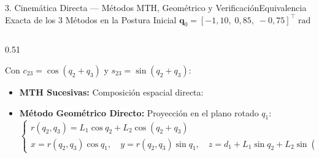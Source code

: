 \documentclass[aspectratio=169,10pt,xcolor=table]{beamer}
\newcommand{\T}{^{\!\top}}
\begin{document}
\begin{frame}{3. Cinemática Directa --- Métodos MTH, Geométrico y Verificación}{Equivalencia Exacta de los 3 Métodos en la Postura Inicial $\bm{q}_0=[-1{,}10,\;0{,}85,\;-0{,}75]\T\;\text{rad}$}
\begin{columns}[T,totalwidth=\textwidth]
  \begin{column}{0.51\textwidth}
    \begin{cajadef}[Matriz de Transformación Total $T_0^3(\bm{q}) = A_1 A_2 A_3$]
      \fontsize{6.5}{7.9}\selectfont
      Con $c_{23}=\cos(q_2+q_3)$ y $s_{23}=\sin(q_2+q_3)$:\\[1mm]
    \end{cajadef}

    \vspace{0.7mm}
    \begin{cajaidea}
      \fontsize{6.5}{7.9}\selectfont
      \begin{itemize}\setlength{\itemsep}{1pt}
        \item \textbf{MTH Sucesivas:} Composición espacial directa:\\[0.8mm]
        \item \textbf{Método Geométrico Directo:} Proyección en el plano rotado $q_1$:
        \[
        \begin{cases}
        r(q_2,q_3) = L_1\cos q_2 + L_2\cos(q_2+q_3)\\
        x = r(q_2,q_3)\cos q_1,\quad y = r(q_2,q_3)\sin q_1,\quad z = d_1 + L_1\sin q_2 + L_2\sin(q_2+q_3)
        \end{cases}
        \]
      \end{itemize}
    \end{cajaidea}
  \end{column}


\end{columns}
\end{frame}
\end{document}
